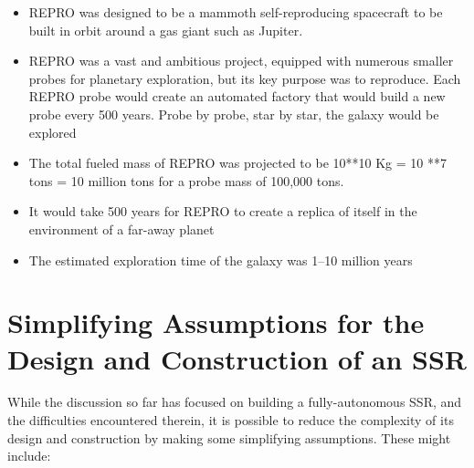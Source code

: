 \begin{itemize}
\item REPRO was designed to be a mammoth self-reproducing spacecraft to be built in
orbit around a gas giant such as Jupiter.
\item REPRO was a vast and ambitious project, equipped with numerous
smaller probes for planetary exploration, but its key purpose was to
reproduce. Each REPRO probe would create an automated factory that
would build a new probe every 500 years. Probe by probe, star by star,
the galaxy would be explored 
\item The total fueled mass of REPRO was projected to be 10**10 Kg = 10
**7 tons = 10 million tons for a probe mass of 100,000 tons.
\item It would take 500 years for REPRO to create a replica of itself in the
environment of a far-away planet
\item The estimated exploration time of the galaxy was 1--10 million
years
\end{itemize}

\section[Simplifying Assumptions]{Simplifying Assumptions for the Design and Construction of an SSR}

While the discussion so far has focused on building a fully-autonomous SSR, and
the difficulties encountered therein,
it is possible to reduce the complexity of its design and construction by making
some simplifying assumptions.  These might include:

